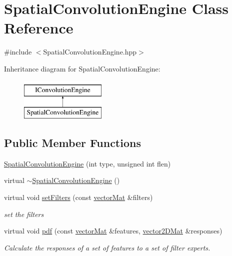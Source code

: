 \hypertarget{classSpatialConvolutionEngine}{\section{\-Spatial\-Convolution\-Engine \-Class \-Reference}
\label{classSpatialConvolutionEngine}
}


{\ttfamily \#include $<$\-Spatial\-Convolution\-Engine.\-hpp$>$}

\-Inheritance diagram for \-Spatial\-Convolution\-Engine\-:\begin{figure}[H]
\begin{center}
\leavevmode
\includegraphics[height=2.000000cm]{classSpatialConvolutionEngine}
\end{center}
\end{figure}
\subsection*{\-Public \-Member \-Functions}
\begin{DoxyCompactItemize}
\item 
\hyperlink{classSpatialConvolutionEngine_a9efb2b7de50aaf86ad6bcb56a953d447}{\-Spatial\-Convolution\-Engine} (int type, unsigned int flen)
\item 
virtual \hyperlink{classSpatialConvolutionEngine_a07b28be0c28a1c47bc6f2a7459155802}{$\sim$\-Spatial\-Convolution\-Engine} ()
\item 
virtual void \hyperlink{classSpatialConvolutionEngine_ad27aad7b65dfa3ec6a617eed96c01d9c}{set\-Filters} (const \hyperlink{types_8hpp_a3207a7addcfa415d1c83622febcb1e9b}{vector\-Mat} \&filters)
\begin{DoxyCompactList}\small\item\em set the filters \end{DoxyCompactList}\item 
virtual void \hyperlink{classSpatialConvolutionEngine_a6db3b5e9428ee74e1b4e9e7f7111cad5}{pdf} (const \hyperlink{types_8hpp_a3207a7addcfa415d1c83622febcb1e9b}{vector\-Mat} \&features, \hyperlink{types_8hpp_a33cacb85be7b8df3dc0b67d5d849f4cc}{vector2\-D\-Mat} \&responses)
\begin{DoxyCompactList}\small\item\em \-Calculate the responses of a set of features to a set of filter experts. \end{DoxyCompactList}\end{DoxyCompactItemize}
